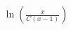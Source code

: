 \documentclass[preview]{standalone}
\begin{document}
\begin{align*}
\ln \left( \frac{x}{C(x-1)} \right)
\end{align*}
\end{document}
